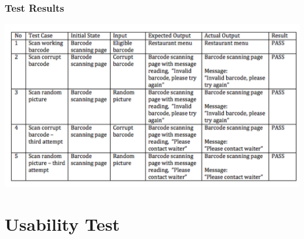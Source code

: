 \documentclass[12pt, titlepage]{article}
\begin{document}
\subsubsection{Test Results}
\includegraphics[width=1.2\textwidth]{barcodeTable.png}

\section{Usability Test}
\end{document}

